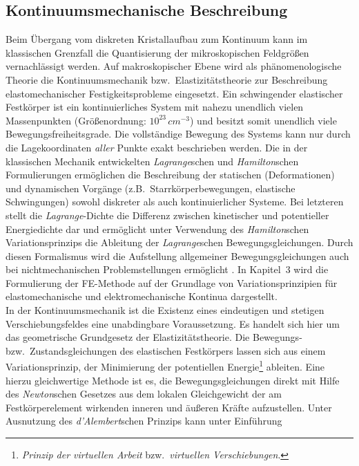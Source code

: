 \subsection{Kontinuumsmechanische Beschreibung}
\label{kontinuumsmechanik}

Beim Übergang vom diskreten Kristallaufbau zum Kontinuum kann im
klassischen Grenzfall die Quantisierung der mikroskopischen Feldgrößen
vernachlässigt werden. Auf makro\-skopischer Ebene wird als phänomenologische
Theorie die Kontinuumsmechanik bzw.\ Elastizitätstheorie zur Beschreibung
elastomechanischer Festigkeitsprobleme eingesetzt.
Ein schwingender elastischer Festkörper ist ein kontinuierliches System
mit nahezu unendlich vielen Massenpunkten (Größenordnung: $10^{23} \,
cm^{-3}$) und besitzt somit unendlich viele Bewegungsfreiheitsgrade. Die
vollständige Bewegung des Systems kann nur durch die Lagekoordinaten
{\em aller} Punkte exakt beschrieben werden.  Die in der klassischen Mechanik
entwickelten {\sl Lagrange}\/schen und {\sl Hamilton}\/schen Formulierungen
ermöglichen die
Beschreibung der statischen (Deformationen) und dynamischen Vorgänge
(z.B.\ Starrkörperbewegungen, elastische Schwingungen) sowohl diskreter
als auch kontinuierlicher Systeme.  Bei letzteren stellt die
{\sl Lagrange}\/-Dichte die Differenz zwischen kinetischer und poten\-tieller
Energiedichte dar und ermöglicht unter Verwendung des {\sl Hamilton}\/schen
Variationsprinzips die Ableitung der {\sl Lagrange}\/schen
Bewegungsgleichungen. Durch diesen Formalismus wird die Aufstellung
allgemeiner Bewegungsgleichungen auch bei nichtmechanischen
Problemstellungen ermöglicht \cite{Gol78}.
In Kapitel~3 wird die Formulierung der FE-Methode auf der Grundlage von
Variationsprinzipien für elastomechanische und elektromechanische
Kontinua dargestellt.\\
In der Kontinuumsmechanik ist die Existenz eines eindeutigen und
stetigen Verschiebungsfeldes eine unabdingbare Voraussetzung. Es handelt
sich hier um das geometrische Grundgesetz der Elastizitätstheorie.
Die Bewegungs- bzw.\ Zustandsgleichungen des elastischen Festkörpers lassen
sich aus einem Variationsprinzip, der Minimierung
der potentiellen Energie\footnote{{\em Prinzip der virtuellen Arbeit} bzw.\
{\em virtuellen Verschiebungen}.} ableiten.
%
%
Eine hierzu gleichwertige Methode ist es, die Bewegungsgleichungen direkt
mit Hilfe des {\sl Newton}\/schen Gesetzes aus dem lokalen Gleichgewicht
der am Festkörperelement wirkenden inneren und äußeren Kräfte aufzustellen.
Unter Ausnutzung des {\sl d'Alembert}\/schen Prinzips kann unter Einführung
